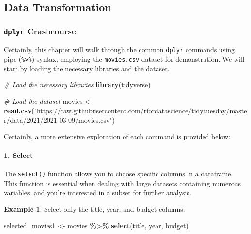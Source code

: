 \documentclass[
]{book}
\newenvironment{Shaded}{\begin{snugshade}}{\end{snugshade}}
\newcommand{\CommentTok}[1]{\textcolor[rgb]{0.56,0.35,0.01}{\textit{#1}}}
\newcommand{\FunctionTok}[1]{\textcolor[rgb]{0.13,0.29,0.53}{\textbf{#1}}}
\newcommand{\NormalTok}[1]{#1}
\newcommand{\OtherTok}[1]{\textcolor[rgb]{0.56,0.35,0.01}{#1}}
\newcommand{\SpecialCharTok}[1]{\textcolor[rgb]{0.81,0.36,0.00}{\textbf{#1}}}
\newcommand{\StringTok}[1]{\textcolor[rgb]{0.31,0.60,0.02}{#1}}
\begin{document}
\subsection*{Data Transformation}\label{data-transformation}

\subsubsection*{\texorpdfstring{\texttt{dplyr} Crashcourse}{dplyr Crashcourse}}\label{dplyr-crashcourse}

Certainly, this chapter will walk through the common \texttt{dplyr} commands using pipe (\texttt{\%\textgreater{}\%}) syntax, employing the \texttt{movies.csv} dataset for demonstration. We will start by loading the necessary libraries and the dataset.

\begin{Shaded}
\begin{Highlighting}[]
\CommentTok{\# Load the necessary libraries}
\FunctionTok{library}\NormalTok{(tidyverse)}

\CommentTok{\# Load the dataset}
\NormalTok{movies }\OtherTok{\textless{}{-}} \FunctionTok{read.csv}\NormalTok{(}\StringTok{"https://raw.githubusercontent.com/rfordatascience/tidytuesday/master/data/2021/2021{-}03{-}09/movies.csv"}\NormalTok{)}
\end{Highlighting}
\end{Shaded}

Certainly, a more extensive exploration of each command is provided below:

\paragraph*{1. Select}\label{select}

The \texttt{select()} function allows you to choose specific columns in a dataframe. This function is essential when dealing with large datasets containing numerous variables, and you're interested in a subset for further analysis.

\textbf{Example 1}: Select only the title, year, and budget columns.

\begin{Shaded}
\begin{Highlighting}[]
\NormalTok{selected\_movies1 }\OtherTok{\textless{}{-}}\NormalTok{ movies }\SpecialCharTok{\%\textgreater{}\%}
  \FunctionTok{select}\NormalTok{(title, year, budget)}
\end{Highlighting}
\end{Shaded}
\end{document}
